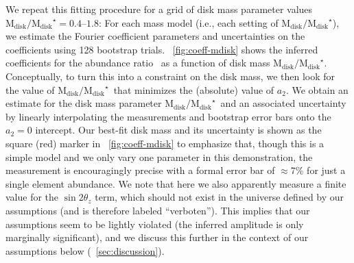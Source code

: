 \documentclass[modern]{aastex63}
\newcommand{\mdisk}{\ensuremath{\mathrm{M}_\mathrm{disk}}}
\newcommand{\mratio}{\ensuremath{\mdisk / \mdisk^\star}}
\begin{document}
We repeat this fitting procedure for a grid of disk mass parameter values
$\mratio = 0.4$--$1.8$:
For each mass model (i.e., each setting of \mratio), we estimate the Fourier
coefficient parameters and uncertainties on the coefficients using 128 bootstrap
trials.
\figurename~\ref{fig:coeff-mdisk} shows the inferred coefficients for the
abundance ratio \mgfe\ as a function of disk mass \mratio.
Conceptually, to turn this into a constraint on the disk mass, we then look for
the value of \mratio\ that minimizes the (absolute) value of $a_2$.
We obtain an estimate for the disk mass parameter \mratio\ and an associated
uncertainty by linearly interpolating the measurements and bootstrap error bars
onto the $a_2=0$ intercept.
Our best-fit disk mass and its uncertainty is shown as the square (red)
marker in \figurename~\ref{fig:coeff-mdisk} to emphasize that, though this is a
simple model and we only vary one parameter in this demonstration, the
measurement is encouragingly precise with a formal error bar of $\approx$7\% for
just a single element abundance.
We note that here we also apparently measure a finite value for the $\sin
2\theta_z$ term, which should not exist in the universe defined by our
assumptions (and is therefore labeled ``verboten'').
This implies that our assumptions seem to be lightly violated (the inferred
amplitude is only marginally significant), and we discuss this further in the
context of our assumptions below (\sectionname~\ref{sec:discussion}).
\end{document}
